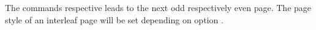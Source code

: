 The commands  respective 
leads to the next odd respectively even page. The page style of an interleaf
page will be set depending on option
.%
%
\EndIndexGroup
%
\EndIndexGroup


